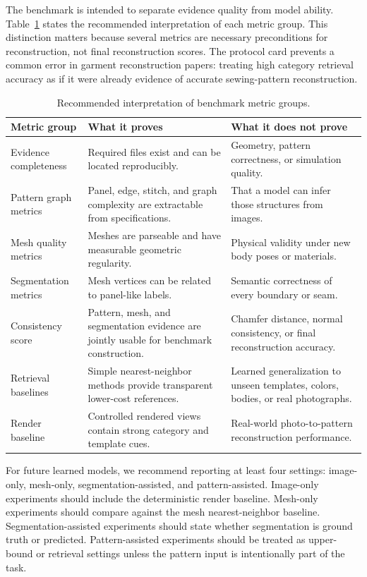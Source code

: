 \documentclass[pdflatex,sn-mathphys-num]{sn-jnl}
\begin{document}
The benchmark is intended to separate evidence quality from model ability. Table~\ref{tab:protocolcard} states the recommended interpretation of each metric group. This distinction matters because several metrics are necessary preconditions for reconstruction, not final reconstruction scores. The protocol card prevents a common error in garment reconstruction papers: treating high category retrieval accuracy as if it were already evidence of accurate sewing-pattern reconstruction.

\begin{table}[!htbp]
\caption{Recommended interpretation of benchmark metric groups.}\label{tab:protocolcard}
\centering
\begin{tabular}{p{}p{}p{}}
\toprule
Metric group & What it proves & What it does not prove \\
\midrule
Evidence completeness & Required files exist and can be located reproducibly. & Geometry, pattern correctness, or simulation quality. \\
Pattern graph metrics & Panel, edge, stitch, and graph complexity are extractable from specifications. & That a model can infer those structures from images. \\
Mesh quality metrics & Meshes are parseable and have measurable geometric regularity. & Physical validity under new body poses or materials. \\
Segmentation metrics & Mesh vertices can be related to panel-like labels. & Semantic correctness of every boundary or seam. \\
Consistency score & Pattern, mesh, and segmentation evidence are jointly usable for benchmark construction. & Chamfer distance, normal consistency, or final reconstruction accuracy. \\
Retrieval baselines & Simple nearest-neighbor methods provide transparent lower-cost references. & Learned generalization to unseen templates, colors, bodies, or real photographs. \\
Render baseline & Controlled rendered views contain strong category and template cues. & Real-world photo-to-pattern reconstruction performance. \\
\bottomrule
\end{tabular}
\end{table}

For future learned models, we recommend reporting at least four settings: image-only, mesh-only, segmentation-assisted, and pattern-assisted. Image-only experiments should include the deterministic render baseline. Mesh-only experiments should compare against the mesh nearest-neighbor baseline. Segmentation-assisted experiments should state whether segmentation is ground truth or predicted. Pattern-assisted experiments should be treated as upper-bound or retrieval settings unless the pattern input is intentionally part of the task.
\end{document}
